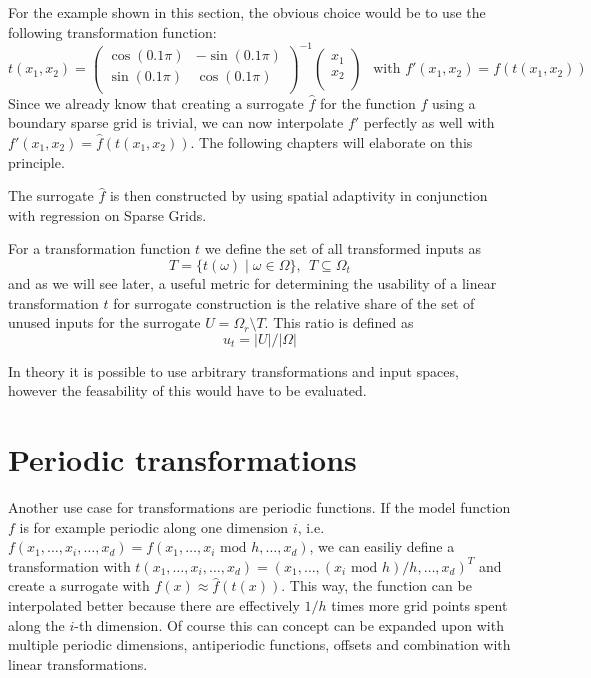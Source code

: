\documentclass[
  a4paper,  %
  twoside,  %
  bibliography=totoc,
  headsepline,
  cleardoublepage=empty,
  parskip=half,
  draft=false
]{scrbook}
\begin{document}
For the example shown in this section, the obvious choice would be to use the following transformation function:
\begin{equation}
t(x_1,x_2)=\begin{pmatrix}
    \cos(0.1 \pi) & -\sin(0.1 \pi)\\
    \sin(0.1 \pi) & \cos(0.1 \pi)
    \\
  \end{pmatrix}^{-1} \begin{pmatrix}
    x_1 \\ x_2
    \\
  \end{pmatrix} ~~ \text{ with } f'(x_1,x_2)=f(t(x_1,x_2)) 
\end{equation}
Since we already know that creating a surrogate $\hat{f}$ for the function $f$ using a boundary sparse grid is trivial, we can now interpolate $f'$ perfectly as well with $f'(x_1,x_2)=\hat{f}(t(x_1,x_2))$.
The following chapters will elaborate on this principle.


The surrogate $\hat{f}$ is then constructed by using spatial adaptivity in conjunction with regression on Sparse Grids.
\begin{definition}
For a transformation function $t$ we define the set of all transformed inputs as
\begin{equation}
T=\{t(\omega)\mid \omega\in\Omega\}, ~~ T \subseteq \Omega_t
\end{equation}
and as we will see later, a useful metric for determining the usability of a linear transformation $t$ for surrogate construction is the relative share of the set of unused inputs for the surrogate $U=\Omega_r \setminus T$.
This ratio is defined as
\begin{equation}
u_t = |U| / |\Omega|
\end{equation}
\end{definition}

In theory it is possible to use arbitrary transformations and input spaces, however the feasability of this would have to be evaluated.

\section{Periodic transformations}

Another use case for transformations are periodic functions.
If the model function $f$ is for example periodic along one dimension $i$, i.e. $f(x_1,\dots,x_i,\dots,x_d)=f(x_1,\dots,x_i\text{ mod } h, \dots,x_d)$, we can easiliy define a transformation with $t(x_1,\dots,x_i,\dots,x_d)=(x_1,\dots,(x_i\text{ mod } h) /h, \dots,x_d)^T$ and create a surrogate with $f(x) \approx \hat{f}(t(x))$.
This way, the function can be interpolated better because there are effectively $1 / h$ times more grid points spent along the $i$-th dimension.
Of course this can concept can be expanded upon with multiple periodic dimensions, antiperiodic functions, offsets and combination with linear transformations.
\end{document}
